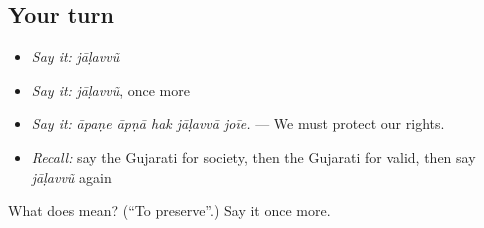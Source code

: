 \subsection*{Your turn}
\begin{itemize}
\raggedright
  \item \emph{Say it:} \emph{jāḷavvũ}
  \item \emph{Say it:} \emph{jāḷavvũ}, once more
  \item \emph{Say it:} \emph{āpaṇe āpṇā hak jāḷavvā joīe.} — We must protect our rights.
  \item \emph{Recall:} say the Gujarati for society, then the Gujarati for valid, then say \emph{jāḷavvũ} again
\end{itemize}

\begin{tcolorbox}[breakable,colback=teal!4,colframe=teal!35!black,title={Before you move on}]
What does  mean? (\textquotedblleft{}To preserve\textquotedblright{}.) Say it once more.
\end{tcolorbox}
